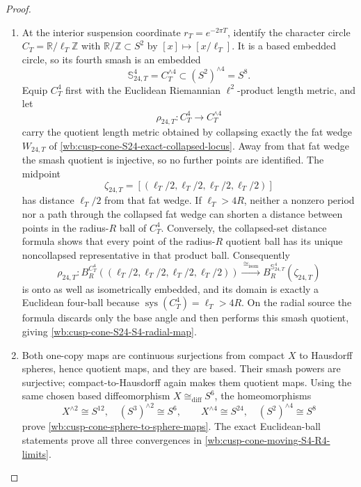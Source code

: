\begin{proof}
\begin{enumerate}[label=\arabic*.,leftmargin=*]
\item At the interior suspension coordinate \(r_T=e^{-2\pi T}\), identify the
character circle \(C_T=\mathbb R/\ell_T\mathbb Z\) with
\(\mathbb R/\mathbb Z\subset S^2\) by \([x]\mapsto[x/\ell_T]\).  It is a
based embedded circle, so its fourth smash is an embedded
\[
 \mathbb S_{24,T}^4=C_T^{\wedge4}\subset(S^2)^{\wedge4}=S^8.
\]
Equip \(C_T^4\) first with the Euclidean Riemannian \(\ell^2\)-product
length metric, and let
\[
 \rho_{24,T}:C_T^4\longrightarrow C_T^{\wedge4}
\]
carry the quotient length metric obtained by collapsing exactly the fat
wedge \(W_{24,T}\) of
\cref{wb:cusp-cone-S24-exact-collapsed-locus}.  Away from that fat wedge the
smash quotient is injective, so no further points are identified.  The
midpoint
\[
 \zeta_{24,T}
 =[(\ell_T/2,\ell_T/2,\ell_T/2,\ell_T/2)]
\]
has distance \(\ell_T/2\) from that fat wedge.  If \(\ell_T>4R\), neither a
nonzero period nor a path through the collapsed fat wedge can shorten a
distance between points in the radius-\(R\) ball of \(C_T^4\).  Conversely,
the collapsed-set distance formula shows that every point of the
radius-\(R\) quotient ball has its unique noncollapsed representative in
that product ball.  Consequently
\begin{equation}
 \rho_{24,T}:
 B_R^{C_T^4}((\ell_T/2,\ell_T/2,\ell_T/2,\ell_T/2))
 \xrightarrow{\ \cong_{\mathrm{isom}}\ }
 B_R^{\mathbb S_{24,T}^4}(\zeta_{24,T})
 \label{wb:cusp-cone-S24-onto-exact-ball}
\end{equation}
is onto as well as isometrically embedded, and its domain is exactly a
Euclidean four-ball because \(\operatorname{sys}(C_T^4)=\ell_T>4R\).  On
the radial source the formula discards only the base angle and then performs
this smash quotient, giving
\cref{wb:cusp-cone-S24-S4-radial-map}.

\item Both one-copy maps are continuous surjections from compact \(X\) to
Hausdorff spheres, hence quotient maps, and they are based.  Their smash
powers are surjective; compact-to-Hausdorff again makes them quotient maps.
Using the same chosen based diffeomorphism \(X\cong_{\mathrm{diff}}S^6\),
the homeomorphisms
\[
 X^{\wedge2}\cong S^{12},\quad(S^3)^{\wedge2}\cong S^6,
 \qquad
 X^{\wedge4}\cong S^{24},\quad(S^2)^{\wedge4}\cong S^8
\]
prove \cref{wb:cusp-cone-sphere-to-sphere-maps}.  The exact Euclidean-ball
statements prove all three convergences in
\cref{wb:cusp-cone-moving-S4-R4-limits}.
\end{enumerate}
\end{proof}

